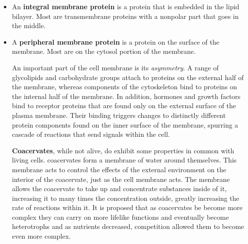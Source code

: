 \documentclass[letterpaper]{article}
\numberwithin{equation}{section}
\theoremstyle{classic}
\begin{document}
\begin{itemize}
\item An \textbf{integral membrane protein} is a protein that is embedded in the lipid bilayer. Most are transmembrane proteins with a nonpolar part that goes in the middle.
\item A \textbf{peripheral membrane protein} is a protein on the surface of the membrane. Most are on the cytosol portion of the membrane.
\begin{review}
    An important part of the cell membrane is its \textit{asymmetry}. A range of glycolipids and carbohydrate groups attach to proteins on the external half of the membrane, whereas components of the cytoskeleton bind to proteins on the internal half of the membrane. In addition, hormones and growth factors bind to receptor proteins that are found only on the external surface of the plasma membrane. Their binding triggers changes to distinctly different protein components found on the inner surface of the membrane, spurring a cascade of reactions that send signals within the cell.
\end{review}
\begin{lab}
    \textbf{Coacervates}, while not alive, do exhibit some properties in common with living cells. coacervates form a membrane of water around themselves. This membrane acts to control the effects of the external environment on the interior of the coacervate, just as the cell membrane acts. The membrane allows the coacervate to take up and concentrate substances inside of it, increasing it to many times the concentration outside, greatly increasing the rate of reactions within it. It is proposed that as coacervates be become more complex they can carry on more lifelike functions and eventually become heterotrophs and as nutrients decreased, competition allowed them to become even more complex.
\end{lab}

\end{itemize}
\end{document}
